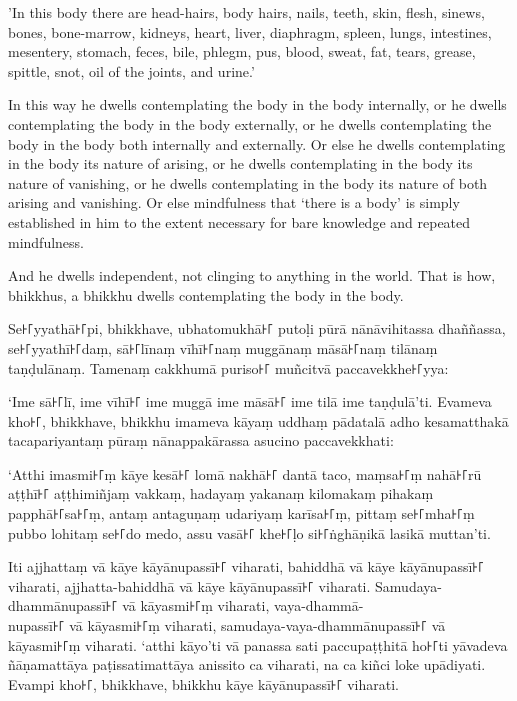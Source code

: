 'In this body there are head-hairs, body hairs, nails, teeth, skin, flesh,
sinews, bones, bone-marrow, kidneys, heart, liver, diaphragm, spleen, lungs,
intestines, mesentery, stomach, feces, bile, phlegm, pus, blood, sweat, fat,
tears, grease, spittle, snot, oil of the joints, and urine.'

In this way he dwells contemplating the body in the body internally, or he
dwells contemplating the body in the body externally, or he dwells contemplating
the body in the body both internally and externally. Or else he dwells
contemplating in the body its nature of arising, or he dwells contemplating in
the body its nature of vanishing, or he dwells contemplating in the body its
nature of both arising and vanishing. Or else mindfulness that ‘there is a body’
is simply established in him to the extent necessary for bare knowledge and
repeated mindfulness.

And he dwells independent, not clinging to anything in the world. That is how,
bhikkhus, a bhikkhu dwells contemplating the body in the body.


\paliPage

Se꜔꜒yyathā꜔꜒pi, bhikkhave, ubhatomukhā꜔꜒ putoḷi pūrā nānāvihitassa dhaññassa,
se꜔꜒yyathī꜔꜒daṃ, sā꜔꜒līnaṃ vīhī꜔꜒naṃ muggānaṃ māsā꜔꜒naṃ tilānaṃ taṇḍulānaṃ. Tamenaṃ
cakkhumā puriso꜔꜒ muñcitvā paccavekkhe꜔꜒yya:

‘Ime sā꜔꜒lī, ime vīhī꜔꜒ ime muggā ime māsā꜔꜒ ime tilā ime taṇḍulā’ti. Evameva kho꜔꜒,
bhikkhave, bhikkhu imameva kāyaṃ uddhaṃ pādatalā adho kesamatthakā
tacapariyantaṃ pūraṃ nānappakārassa asucino paccavekkhati:

‘Atthi imasmi꜔꜒ṃ kāye kesā꜔꜒ lomā nakhā꜔꜒ dantā taco, maṃsa꜔꜒ṃ nahā꜔꜒rū aṭṭhī꜔꜒ aṭṭhimiñjaṃ
vakkaṃ, hadayaṃ yakanaṃ kilomakaṃ pihakaṃ papphā꜔꜒sa꜔꜒ṃ, antaṃ antaguṇaṃ udariyaṃ
karīsa꜔꜒ṃ, pittaṃ se꜔꜒mha꜔꜒ṃ pubbo lohitaṃ se꜔꜒do medo, assu vasā꜔꜒ khe꜔꜒ḷo si꜔꜒ṅghāṇikā
lasikā muttan’ti.

Iti ajjhattaṃ vā kāye kāyānupassī꜔꜒ viharati, bahiddhā vā kāye kāyānupassī꜔꜒
viharati, ajjhatta-bahiddhā vā kāye kāyānupassī꜔꜒ viharati. Samudaya-dhammānupassī꜔꜒
vā kāyasmi꜔꜒ṃ viharati, vaya-dhammā-\\
nupassī꜔꜒ vā kāyasmi꜔꜒ṃ viharati, samudaya-vaya-dhammānupassī꜔꜒ vā kāyasmi꜔꜒ṃ viharati.
‘atthi kāyo’ti vā panassa sati paccupaṭṭhitā ho꜔꜒ti yāvadeva ñāṇamattāya
paṭissatimattāya anissito ca viharati, na ca kiñci loke upādiyati. Evampi kho꜔꜒,
bhikkhave, bhikkhu kāye kāyānupassī꜔꜒ viharati.


